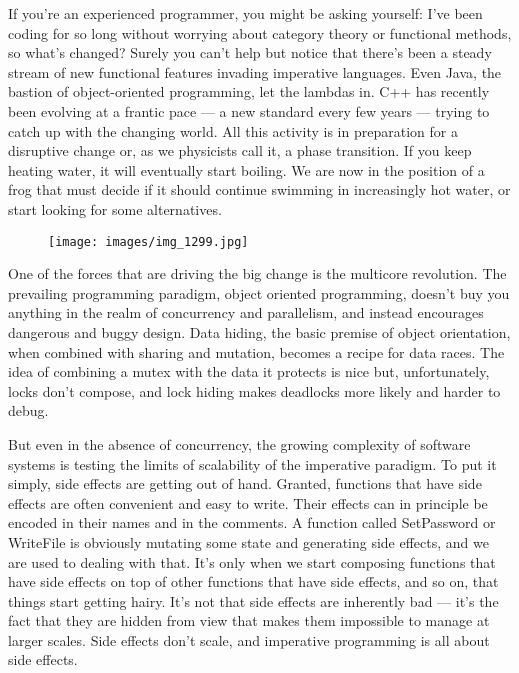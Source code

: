 If you're an experienced programmer, you might be asking yourself: I've
been coding for so long without worrying about category theory or
functional methods, so what's changed? Surely you can't help but notice
that there's been a steady stream of new functional features invading
imperative languages. Even Java, the bastion of object-oriented
programming, let the lambdas in. C++ has recently been evolving at a
frantic pace --- a new standard every few years --- trying to catch up
with the changing world. All this activity is in preparation for a
disruptive change or, as we physicists call it, a phase transition. If
you keep heating water, it will eventually start boiling. We are now in
the position of a frog that must decide if it should continue swimming
in increasingly hot water, or start looking for some alternatives.

\begin{figure}[H]
  \centering
  \texttt{[image: images/img\_1299.jpg]}
\end{figure}

\noindent
One of the forces that are driving the big change is the multicore
revolution. The prevailing programming paradigm, object oriented
programming, doesn't buy you anything in the realm of concurrency and
parallelism, and instead encourages dangerous and buggy design. Data
hiding, the basic premise of object orientation, when combined with
sharing and mutation, becomes a recipe for data races. The idea of
combining a mutex with the data it protects is nice but, unfortunately,
locks don't compose, and lock hiding makes deadlocks more likely and
harder to debug.

But even in the absence of concurrency, the growing complexity of
software systems is testing the limits of scalability of the imperative
paradigm. To put it simply, side effects are getting out of hand.
Granted, functions that have side effects are often convenient and easy
to write. Their effects can in principle be encoded in their names and
in the comments. A function called SetPassword or WriteFile is obviously
mutating some state and generating side effects, and we are used to
dealing with that. It's only when we start composing functions that have
side effects on top of other functions that have side effects, and so
on, that things start getting hairy. It's not that side effects are
inherently bad --- it's the fact that they are hidden from view that
makes them impossible to manage at larger scales. Side effects don't
scale, and imperative programming is all about side effects.

